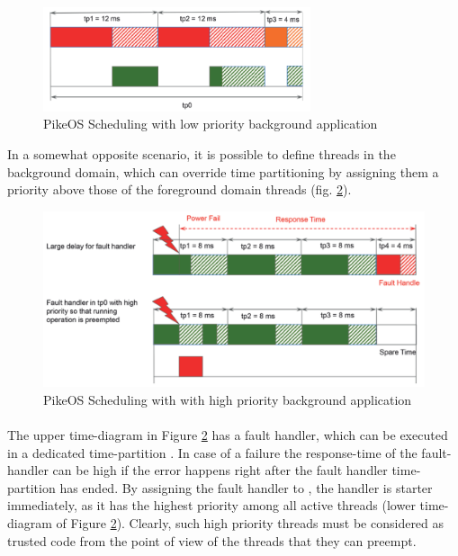 \begin{figure}[htbp] 
\centering    
\includegraphics[width=0.7\textwidth]{PikeosLowTP0}
\caption{PikeOS Scheduling with low priority background application}
\label{fig:PikeosLowTP0}
\end{figure}

In a somewhat opposite scenario, it is possible to define threads in the background domain, which can override time partitioning by assigning them a priority above those of the foreground domain threads (fig. \ref{fig:PikeosHighTP0}). 

\begin{figure}[htbp] 
\centering    
\includegraphics[width=1.0\textwidth]{PikeosHighTP0}
\caption{PikeOS Scheduling with with high priority background application}
\label{fig:PikeosHighTP0}
\end{figure}

\paragraph{}The upper time-diagram in Figure \ref{fig:PikeosHighTP0} has a fault handler, which can be executed in a dedicated time-partition . In case of a failure the response-time of the fault-handler can be high if the error happens right after the fault handler time-partition has ended. By assigning the fault handler to , the handler is starter immediately, as it has the highest priority among all active threads (lower time-diagram of Figure \ref{fig:PikeosHighTP0}). Clearly, such high priority threads must be considered as trusted code from the point of view of the threads that they can preempt.

